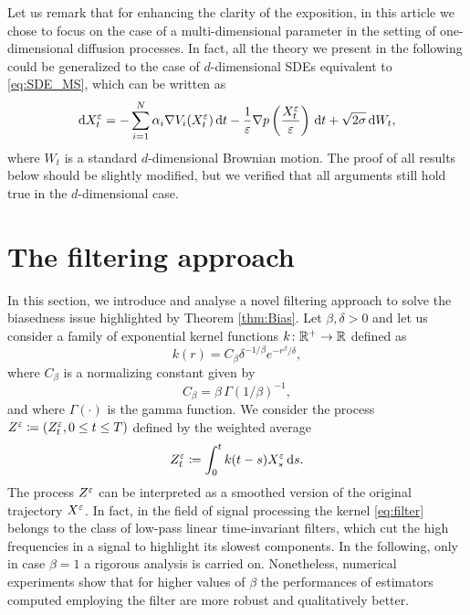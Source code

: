 \documentclass[10pt]{article}
\begin{document}
\begin{remark} Let us remark that for enhancing the clarity of the exposition, in this article we chose to focus on the case of a multi-dimensional parameter in the setting of one-dimensional diffusion processes. In fact, all the theory we present in the following could be generalized to the case of $d$-dimensional SDEs equivalent to \eqref{eq:SDE_MS}, which can be written as
	\begin{equation}
		\mathrm{d} X_t^\varepsilon = - \sum_{i=1}^N \alpha_i \nabla V_i(X_t^\varepsilon) \,\mathrm{d} t - \frac1{\varepsilon} \nabla p\left(\frac{X_t^\varepsilon}{\varepsilon}\right) \,\mathrm{d} t + \sqrt{2\sigma} \,\mathrm{d} W_t,
	\end{equation}
	where $W_t$ is a standard $d$-dimensional Brownian motion. The proof of all results below should be slightly modified, but we verified that all arguments still hold true in the $d$-dimensional case. 
\end{remark}

\section{The filtering approach}\label{sec:Filter}

In this section, we introduce and analyse a novel filtering approach to solve the biasedness issue highlighted by Theorem \ref{thm:Bias}. Let $\beta, \delta > 0$ and let us consider a family of exponential kernel functions $k \colon \mathbb{R}^+ \to \mathbb{R}$ defined as
\begin{equation}\label{eq:filter}
k(r) = C_\beta \delta^{-1/\beta} e^{-r^\beta/\delta},
\end{equation}
where $C_{\beta}$ is a normalizing constant given by
\begin{equation}
C_\beta = \beta \, \Gamma(1/\beta)^{-1},
\end{equation}
and where $\Gamma(\cdot)$ is the gamma function. We consider the process $Z^\varepsilon \coloneqq (Z^\varepsilon_t, 0 \leq t \leq T)$ defined by the weighted average
\begin{equation}\label{eq:ZDef}
	Z^{\varepsilon}_t \coloneqq \int_0^t k(t - s)X^\varepsilon_s \,\mathrm{d} s.
\end{equation}
The process $Z^\varepsilon$ can be interpreted as a smoothed version of the original trajectory $X^\varepsilon$. In fact, in the field of signal processing the kernel \eqref{eq:filter} belongs to the class of low-pass linear time-invariant filters, which cut the high frequencies in a signal to highlight its slowest components. In the following, only in case $\beta = 1$ a rigorous analysis is carried on. Nonetheless, numerical experiments show that for higher values of $\beta$ the performances of estimators computed employing the filter are more robust and qualitatively better. 
\end{document}

